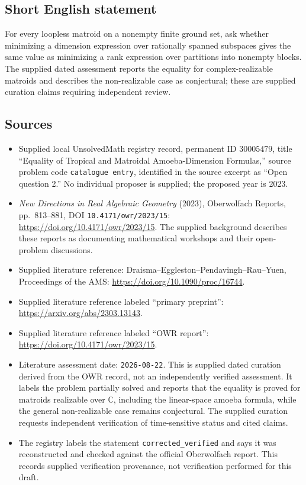 \documentclass[11pt]{article}
\newcommand{\C}{\mathbb{C}}
\begin{document}
\subsection{Short English statement}
For every loopless matroid on a nonempty finite ground set, ask whether minimizing a dimension expression over rationally spanned subspaces gives the same value as minimizing a rank expression over partitions into nonempty blocks. The supplied dated assessment reports the equality for complex-realizable matroids and describes the non-realizable case as conjectural; these are supplied curation claims requiring independent review.
\subsection{Sources}
\begin{itemize}
\item Supplied local UnsolvedMath registry record, permanent ID \(30005479\), title ``Equality of Tropical and Matroidal Amoeba-Dimension Formulas,'' source problem code \texttt{catalogue entry}, identified in the source excerpt as ``Open question 2.'' No individual proposer is supplied; the proposed year is 2023.
\item \emph{New Directions in Real Algebraic Geometry} (2023), Oberwolfach Reports, pp.\ 813--881, DOI \texttt{10.4171/owr/2023/15}: \url{https://doi.org/10.4171/owr/2023/15}. The supplied background describes these reports as documenting mathematical workshops and their open-problem discussions.
\item Supplied literature reference: Draisma--Eggleston--Pendavingh--Rau--Yuen, Proceedings of the AMS: \url{https://doi.org/10.1090/proc/16744}.
\item Supplied literature reference labeled ``primary preprint'': \url{https://arxiv.org/abs/2303.13143}.
\item Supplied literature reference labeled ``OWR report'': \url{https://doi.org/10.4171/owr/2023/15}.
\item Literature assessment date: \texttt{2026-08-22}. This is supplied dated curation derived from the OWR record, not an independently verified assessment. It labels the problem partially solved and reports that the equality is proved for matroids realizable over \(\C\), including the linear-space amoeba formula, while the general non-realizable case remains conjectural. The supplied curation requests independent verification of time-sensitive status and cited claims.
\item The registry labels the statement \texttt{corrected\_verified} and says it was reconstructed and checked against the official Oberwolfach report. This records supplied verification provenance, not verification performed for this draft.
\end{itemize}
\end{document}
